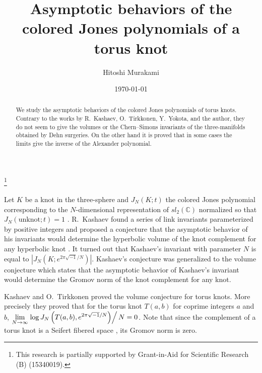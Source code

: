 \documentclass[a4paper,draft]{amsart}
\theoremstyle{plain}
\theoremstyle{definition}
\theoremstyle{remark}
\newcommand{\C}{\mathbb{C}}
\numberwithin{equation}{section}
\begin{document}
\title[The colored Jones polynomials of a torus knot]
{Asymptotic behaviors of the colored Jones polynomials of a torus knot}
\author{Hitoshi Murakami}
\address{
Department of Mathematics,
Tokyo Institute of Technology,
Oh-okayama, Meguro, Tokyo 152-8551, Japan
}
\date{\today}
\begin{abstract}
We study the asymptotic behaviors of the colored Jones polynomials
of torus knots.
Contrary to the works by R.~Kashaev, O.~Tirkkonen, Y.~Yokota, and the author,
they do not seem to give the volumes or the Chern--Simons invariants of
the three-manifolds obtained by Dehn surgeries.
On the other hand it is proved that in some cases the limits give the inverse of
the Alexander polynomial.
\end{abstract}
\thanks{This research is partially supported by Grant-in-Aid for Scientific
Research (B) (15340019).}
\maketitle
Let $K$ be a knot in the three-sphere and $J_N(K;t)$ the colored Jones
polynomial corresponding to the $N$-dimensional representation of $sl_2(\C)$
normalized so that $J_N(\text{unknot};t)=1$
\cite{Jones:BULAM385,Kirillov/Reshetikhin:89}.
R.~Kashaev found a series of link invariants parameterized by positive integers
\cite{Kashaev:MODPLA95} and proposed a conjecture that the asymptotic behavior
of his invariants would determine the hyperbolic volume of the knot complement
for any hyperbolic knot \cite{Kashaev:LETMP97}.
It turned out \cite{Murakami/Murakami:ACTAM101} that Kashaev's invariant with
parameter $N$ is equal to
$\left|J_N\left(K;e^{2\pi\sqrt{-1}/N}\right)\right|$.
Kashaev's conjecture was generalized to the volume conjecture which states
that the asymptotic behavior of Kashaev's invariant would determine the
Gromov norm \cite{Gromov:INSHE82} of the knot complement for any knot.
\par
Kashaev and O.~Tirkkonen \cite{Kashaev/Tirkkonen:ZAPNS200} proved the volume
conjecture for torus knots.
More precisely they proved that for the torus knot $T(a,b)$ for coprime integers
$a$ and $b$,
$\displaystyle
\lim_{N\to\infty}
\left.\log{J_N\left(T(a,b),e^{2\pi\sqrt{-1}/N}\right)}\right/N=0$.
Note that since the complement of a torus knot is a Seifert fibered space
\cite{Moser:PACJM1971}, its Gromov norm is zero.
\par
\end{document}
